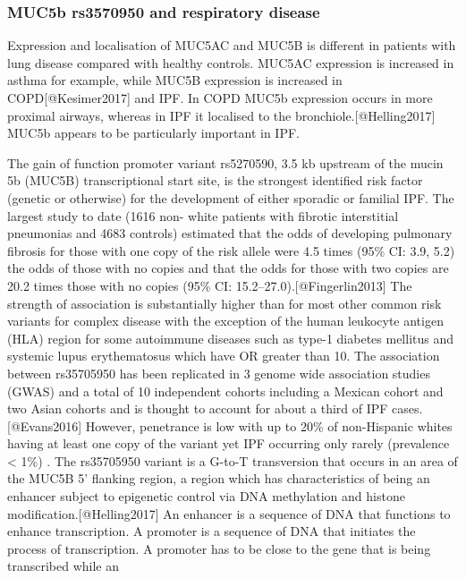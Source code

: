 \documentclass[
]{article}
\begin{document}
\hypertarget{muc5b-rs3570950-and-respiratory-disease}{%
\subsubsection{MUC5b rs3570950 and respiratory
disease}\label{muc5b-rs3570950-and-respiratory-disease}}

Expression and localisation of MUC5AC and MUC5B is different in patients
with lung disease compared with healthy controls. MUC5AC expression is
increased in asthma for example, while MUC5B expression is increased in
COPD{[}@Kesimer2017{]} and IPF. In COPD MUC5b expression occurs in more
proximal airways, whereas in IPF it localised to the
bronchiole.{[}@Helling2017{]} MUC5b appears to be particularly important
in IPF.

The gain of function promoter variant rs5270590, 3.5 kb upstream of the
mucin 5b (MUC5B) transcriptional start site, is the strongest identified
risk factor (genetic or otherwise) for the development of either
sporadic or familial IPF. The largest study to date (1616 non- white
patients with fibrotic interstitial pneumonias and 4683 controls)
estimated that the odds of developing pulmonary fibrosis for those with
one copy of the risk allele were 4.5 times (95\% CI: 3.9, 5.2) the odds
of those with no copies and that the odds for those with two copies are
20.2 times those with no copies (95\% CI:
15.2--27.0).{[}@Fingerlin2013{]} The strength of association is
substantially higher than for most other common risk variants for
complex disease with the exception of the human leukocyte antigen (HLA)
region for some autoimmune diseases such as type-1 diabetes mellitus and
systemic lupus erythematosus which have OR greater than 10. The
association between rs35705950 has been replicated in 3 genome wide
association studies (GWAS) and a total of 10 independent cohorts
including a Mexican cohort and two Asian cohorts and is thought to
account for about a third of IPF cases.{[}@Evans2016{]} However,
penetrance is low with up to 20\% of non-Hispanic whites having at least
one copy of the variant yet IPF occurring only rarely (prevalence
\textless{} 1\%) . The rs35705950 variant is a G-to-T transversion that
occurs in an area of the MUC5B 5' flanking region, a region which has
characteristics of being an enhancer subject to epigenetic control via
DNA methylation and histone modification.{[}@Helling2017{]} An enhancer
is a sequence of DNA that functions to enhance transcription. A promoter
is a sequence of DNA that initiates the process of transcription. A
promoter has to be close to the gene that is being transcribed while an
\end{document}
